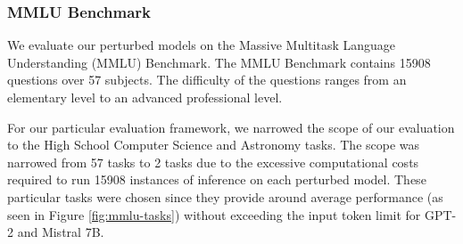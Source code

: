 \subsubsection{MMLU Benchmark}
We evaluate our perturbed models on the Massive Multitask Language Understanding (MMLU) Benchmark. The MMLU Benchmark contains 15908 questions over 57 subjects. The difficulty of the questions ranges from an elementary level to an advanced professional level\cite{hendrycks2021measuringmassivemultitasklanguage}. 

For our particular evaluation framework, we narrowed the scope of our evaluation to the High School Computer Science and Astronomy tasks. The scope was narrowed from 57 tasks to 2 tasks due to the excessive computational costs required to run 15908 instances of inference on each perturbed model. These particular tasks were chosen since they provide around average performance (as seen in Figure \ref{fig:mmlu-tasks}) without exceeding the input token limit for GPT-2 and Mistral 7B.
